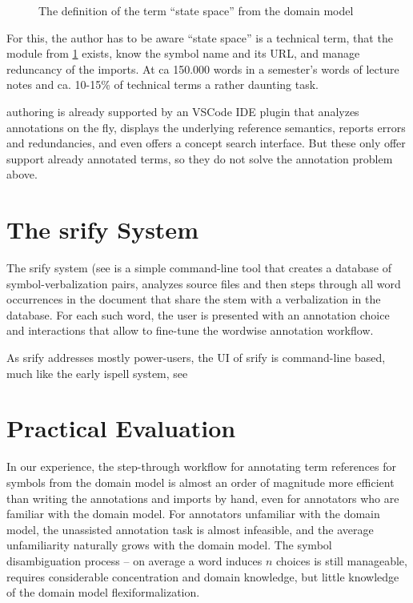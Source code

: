 \documentclass{llncs}
\newcommand\srf{\textsf{srify}\xspace}
\begin{document}
\begin{figure}[ht]\centering
  \caption{The definition of the term ``state space'' from the domain model}\label{fig:state-space}
\end{figure}

For this, the author has to be aware ``state space'' is a technical term, that the module
from \cref{fig:state-space} exists, know the symbol name and its URL, and manage
reduncancy of the imports. At ca 150.000 words in a semester's words of lecture notes and
ca. 10-15\% of technical terms a rather daunting task.

\sTeX authoring is already supported by an VSCode IDE plugin \cite{sTeX-IDE:git} that
analyzes annotations on the fly, displays the underlying reference semantics, reports
errors and redundancies, and even offers a concept search interface. But these only offer
support already annotated terms, so they do not solve the annotation problem above.

\section{The \srf System}

The \srf system (see \cite{stextools:git} is a simple command-line tool that creates a
database of symbol-verbalization pairs, analyzes \sTeX source
files and then steps through all word occurrences in the document that share the stem with
a verbalization in the database. For each such word, the user is presented with an
annotation choice and interactions that allow to fine-tune the wordwise annotation
workflow.

As \srf addresses mostly power-users, the UI of \srf is command-line based, much like the
early \textsf{ispell} system, see

\section{Practical Evaluation}

In our experience, the step-through workflow for annotating term references for symbols
from the domain model is almost an order of magnitude more efficient than writing the
annotations and imports by hand, even for annotators who are familiar with the domain
model. For annotators unfamiliar with the domain model, the unassisted annotation task is
almost infeasible, and the average unfamiliarity naturally grows with the domain
model. The symbol disambiguation process -- on average a word induces $n$ choices is still manageable,
requires considerable concentration and domain knowledge, but little knowledge of the
domain model flexiformalization.
\end{document}
